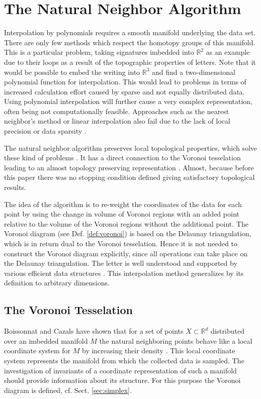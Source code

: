 \documentclass[journal]{IEEEtran}
\begin{document}
\section{The Natural Neighbor Algorithm}
\label{sec:natneighbor}
Interpolation by polynomials requires a smooth manifold underlying the data set. There are only few methods which respect the homotopy groups of this manifold. This is a particular problem, taking signatures imbedded into $\mathbb{R}^2$ as an example due to their loops as a result of the topographic properties of letters. Note that it would be possible to embed the writing into $\mathbb{R}^3$ and find a two-dimensional polynomial function for interpolation. This would lead to problems in terms of increased calculation effort caused by sparse and not equally distributed data. Using polynomial interpolation will further cause a very complex representation, often being not computationally feasible. Approaches such as the nearest neighbor's method or linear interpolation also fail due to the lack of local precision or data sparsity \cite{BoissonnatC00}.

The natural neighbor algorithm preserves local topological properties, which solve these kind of problems \cite{Bobach2009}. It has a direct connection to the Voronoi tesselation leading to an almost topology preserving representation \cite{Sibson}. Almost, because before this paper there was no stopping condition defined giving satisfactory topological results.

The idea of the algorithm is to re-weight the coordinates of the data for each point by using the change in volume of Voronoi regions with an added point relative to the volume of the Voronoi regions without the additional point. The Voronoi diagram (see Def. \ref{def:voronoi}) is based on the Delaunay triangulation, which is in return dual to the Voronoi tesselation. Hence it is not needed to construct the Voronoi diagram explicitly, since all operations can take place on the Delaunay triangulation. The letter is well understood and supported by various efficient data structures \cite{DevillersMT91}. This interpolation method generalizes by its definition to arbitrary dimensions.

\subsection{The Voronoi Tesselation}
Boissonnat and Cazals have shown that for a set of points $X \subset \mathbb{R}^d$ distributed over an imbedded manifold $M$ the natural neighboring points behave like a local coordinate system for $M$ by increasing their density \cite{BoissonnatC01}. This local coordinate system represents the manifold from which the collected data is sampled. The investigation of invariants of a coordinate representation of such a manifold should provide information about its structure. For this purpose the Voronoi diagram is defined, cf. Sect. \ref{sec:simplex}.
\end{document}
